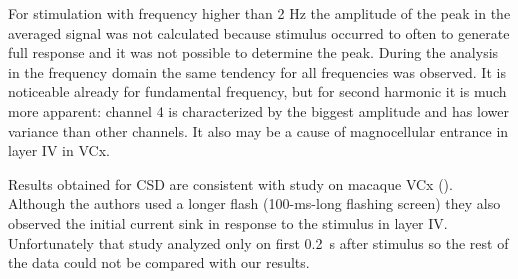\documentclass{pracalicmgr}
\begin{document}
    For stimulation with frequency higher than 2 Hz the amplitude of the peak in the averaged signal was not calculated because stimulus occurred to often to generate full response and it was not possible to determine the peak. During the analysis in the frequency domain the same tendency for all frequencies was observed. It is noticeable already for fundamental frequency, but for second harmonic it is much more apparent: channel 4 is characterized by the biggest amplitude and has lower variance than other channels. It also may be a cause of magnocellular entrance in layer IV in VCx.
    
    Results obtained for CSD are consistent with study on macaque VCx (\cite{maier2011}). Although the authors used a longer flash (100-ms-long flashing screen) they also observed the initial current sink in response to the stimulus in layer IV. Unfortunately that study analyzed only on first 0.2~s after stimulus so the rest of the data could not be compared with our results. 
    

\printbibliography[heading=bibintoc]
\end{document}
